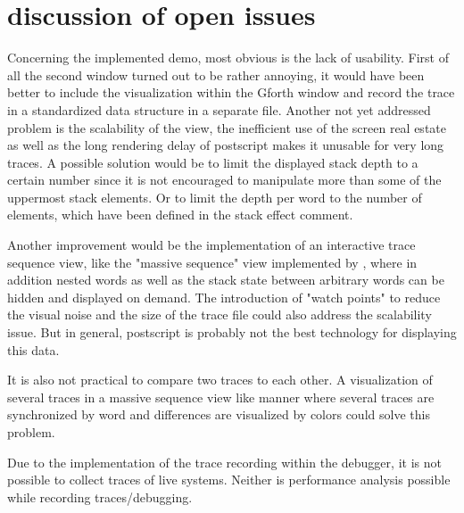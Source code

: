 \section{discussion of open issues}

Concerning the implemented demo, most obvious is the lack of usability. First of all the second window turned out to be rather annoying, it would have been better to include the visualization within the Gforth window and record the trace in a standardized data structure in a separate file.
Another not yet addressed problem is the scalability of the view, the inefficient use of the screen real estate as well as the long rendering delay of postscript makes it unusable for very long traces. A possible solution would be to limit the displayed stack depth to a certain number since it is not encouraged to manipulate more than some of the uppermost stack elements. Or to limit the depth per word to the number of elements, which have been defined in the stack effect comment.

Another improvement would be the implementation of an interactive trace sequence view, like the "massive sequence" view implemented by \cite{Cornelissen:2008:ETA:1454787.1454981}, where in addition nested words as well as the stack state between arbitrary words can be hidden and displayed on demand. The introduction of "watch points" to reduce the visual noise and the size of the trace file could also address the scalability issue. But in general, postscript is probably not the best technology for displaying this data.

It is also not practical to compare two traces to each other. A visualization of several traces in a massive sequence view like manner where several traces are synchronized by word and differences are visualized by colors could solve this problem.

Due to the implementation of the trace recording within the debugger, it is not possible to collect traces of live systems. Neither is performance analysis possible while recording traces/debugging.
 

